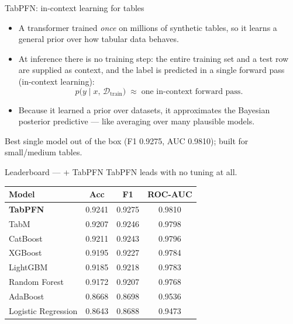 \documentclass[aspectratio=169]{beamer}
\begin{document}
\begin{frame}{TabPFN: in-context learning for tables}
\small
\begin{itemize}
    \item A transformer trained \emph{once} on millions of synthetic tables,
          so it learns a general prior over how tabular data behaves.
    \item At inference there is no training step: the entire training set and a
          test row are supplied as context, and the label is predicted in a
          single forward pass (in-context learning):
    \[
    p\big(y \mid x,\, \mathcal{D}_{\text{train}}\big)\;\approx\;\text{one in-context forward pass}.
    \]
    \item Because it learned a prior over datasets, it approximates the Bayesian
          posterior predictive --- like averaging over many plausible models.
\end{itemize}
\vspace{0.1cm}
{\footnotesize Best single model out of the box (F1 0.9275, AUC 0.9810); built for small/medium tables.}
\end{frame}

\begin{frame}{Leaderboard --- + TabPFN}
\footnotesize
TabPFN leads with no tuning at all.
\vspace{0.25cm}
\begin{center}
\begin{tabular}{lccc}
\toprule
\textbf{Model} & \textbf{Acc} & \textbf{F1} & \textbf{ROC-AUC} \\
\midrule
\rowcolor{accent!18}\textbf{TabPFN} & 0.9241 & 0.9275 & 0.9810 \\
TabM & 0.9207 & 0.9246 & 0.9798 \\
CatBoost & 0.9211 & 0.9243 & 0.9796 \\
XGBoost & 0.9195 & 0.9227 & 0.9784 \\
LightGBM & 0.9185 & 0.9218 & 0.9783 \\
Random Forest & 0.9172 & 0.9207 & 0.9768 \\
AdaBoost & 0.8668 & 0.8698 & 0.9536 \\
Logistic Regression & 0.8643 & 0.8688 & 0.9473 \\
\bottomrule
\end{tabular}
\end{center}
\end{frame}
\end{document}
